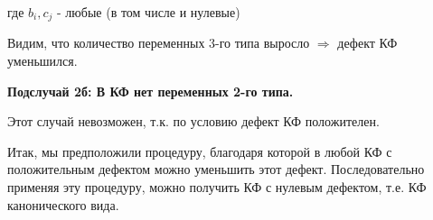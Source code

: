 где $b_i, c_j$ - любые (в том числе и нулевые)

Видим, что количество переменных 3-го типа выросло $\Rightarrow$ дефект КФ уменьшился.

\bigbreak

\textbf{Подслучай 2б: В КФ нет переменных 2-го типа.}

Этот случай невозможен, т.к. по условию дефект КФ положителен.
\bigbreak

Итак, мы предположили процедуру, благодаря которой в любой КФ с положительным дефектом можно уменьшить этот дефект. Последовательно применяя эту процедуру, можно получить КФ с нулевым дефектом, т.е. КФ канонического вида.